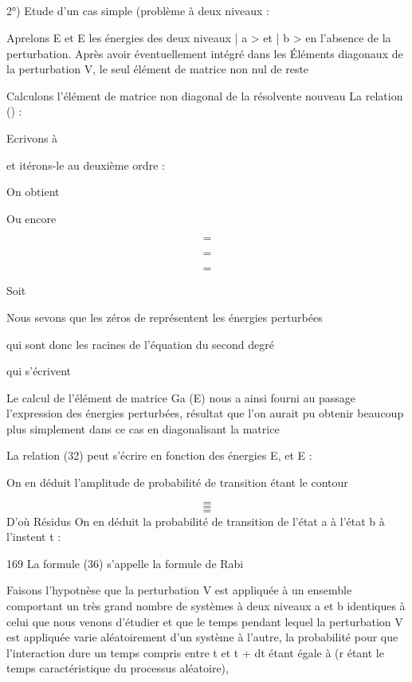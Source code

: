 \subsection{}
2°) Etude d'un cas simple (problème à deux niveaux :

Aprelons E et E les énergies des deux niveaux | a > et | b > en
l'absence de la perturbation. Après avoir éventuellement intégré dans  les
Éléments diagonaux de la perturbation V, le seul élément de matrice non nul de
 reste 

Calculons l'élément de matrice non diagonal de la résolvente 
nouveau La relation () :

Ecrivons à

et itérons-le au deuxième ordre :

On obtient

Ou encore

\[
\tag{32}=
\]

\[
\tag{33}=
\]

\[
\tag{34}=
\]


Soit

Nous sevons que les zéros de  représentent les énergies perturbées

qui sont donc les racines de l'équation du second degré

qui s'écrivent

Le calcul de l'élément de matrice Ga (E) nous a ainsi fourni au passage l'expression
des énergies perturbées, résultat que l'on aurait pu obtenir beaucoup
plus simplement dans ce cas en diagonalisant la matrice

La relation (32) peut s'écrire en fonction des énergies E, et E :

On en déduit l'amplitude de probabilité de transition
 étant le contour


\[
\tag{36}=
\]
\[
\tag{37}=
\]
\[
\tag{}=
\]
D'où
Résidus
On en déduit la probabilité de transition de l'état a à l'état b à l'instent t :

169
La formule (36) s'appelle la formule de Rabi

Faisons l'hypotnèse que la perturbation V est appliquée à un ensemble comportant un très
grand nombre de systèmes à deux niveaux a et b identiques
à celui que nous venons d'étudier et que le temps pendant lequel la perturbation
V est appliquée varie aléatoirement d'un système à l'autre, la probabilité pour
que l'interaction dure un temps compris entre t et t + dt étant égale à 
(r étant le temps caractéristique du processus aléatoire),

